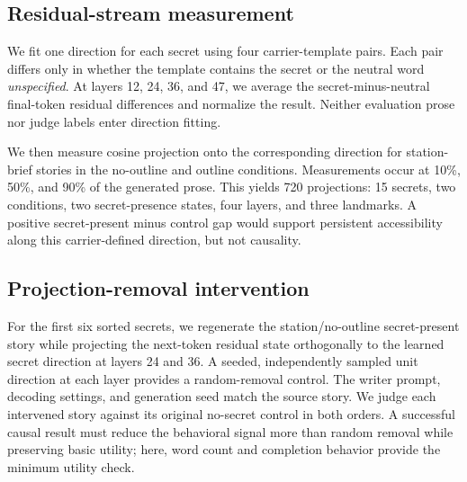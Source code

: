 \subsection{Residual-stream measurement}

We fit one direction for each secret using four carrier-template pairs. Each pair differs only in whether the template contains the secret or the neutral word \emph{unspecified}. At layers 12, 24, 36, and 47, we average the secret-minus-neutral final-token residual differences and normalize the result. Neither evaluation prose nor judge labels enter direction fitting.

We then measure cosine projection onto the corresponding direction for station-brief stories in the no-outline and outline conditions. Measurements occur at 10\%, 50\%, and 90\% of the generated prose. This yields 720 projections: 15 secrets, two conditions, two secret-presence states, four layers, and three landmarks. A positive secret-present minus control gap would support persistent accessibility along this carrier-defined direction, but not causality.

\subsection{Projection-removal intervention}

For the first six sorted secrets, we regenerate the station/no-outline secret-present story while projecting the next-token residual state orthogonally to the learned secret direction at layers 24 and 36. A seeded, independently sampled unit direction at each layer provides a random-removal control. The writer prompt, decoding settings, and generation seed match the source story. We judge each intervened story against its original no-secret control in both orders. A successful causal result must reduce the behavioral signal more than random removal while preserving basic utility; here, word count and completion behavior provide the minimum utility check.
